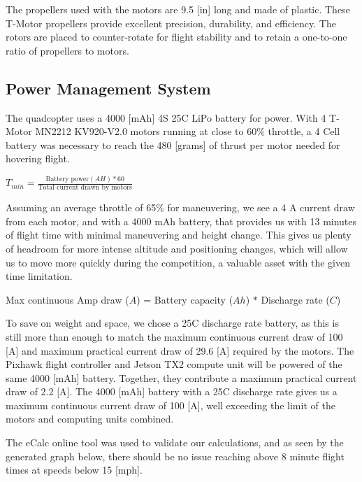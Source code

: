 \documentclass[12pt,letterpaper]{article}
\begin{document}
The propellers used with the motors are 9.5 [in] long and made of plastic. These T-Motor propellers provide excellent precision, durability, and efficiency. The rotors are placed to counter-rotate for flight stability and to retain a one-to-one ratio of propellers to motors.

	\subsection*{Power Management System}
The quadcopter uses a 4000 [mAh] 4S 25C LiPo battery for power. With 4 T-Motor MN2212 KV920-V2.0  motors running at close to 60\% throttle, a 4 Cell battery was necessary to reach the 480 [grams] of thrust per motor needed for hovering flight.
\begin{center}
	$T_{min} = \frac{\text{Battery power}(AH) * 60}{\text{Total current drawn by motors}}$
\end{center}

Assuming an average throttle of 65\% for maneuvering, we see a 4 A current draw from each motor, and with a 4000 mAh battery, that provides us with 13 minutes of flight time with minimal maneuvering and height change. This gives us plenty of headroom for more intense altitude and positioning changes, which will allow us to move more quickly during the competition, a valuable asset with the given time limitation.
\begin{center}
	Max continuous Amp draw ($A$) = Battery capacity ($Ah$) $*$ Discharge rate ($C$)
\end{center}

To save on weight and space, we chose a 25C discharge rate battery, as this is still more than enough to match the maximum continuous current draw of 100 [A] and maximum practical current draw of 29.6 [A] required by the motors. The Pixhawk flight controller and Jetson TX2 compute unit will be powered of the same 4000 [mAh] battery. Together, they contribute a maximum practical current draw of 2.2 [A]. The 4000 [mAh] battery with a 25C discharge rate gives us a maximum continuous current draw of 100 [A], well exceeding the limit of the motors and computing units combined.

The eCalc online tool was used to validate our calculations, and as seen by the generated graph below, there should be no issue reaching above 8 minute flight times at speeds below 15 [mph].

\end{document}
